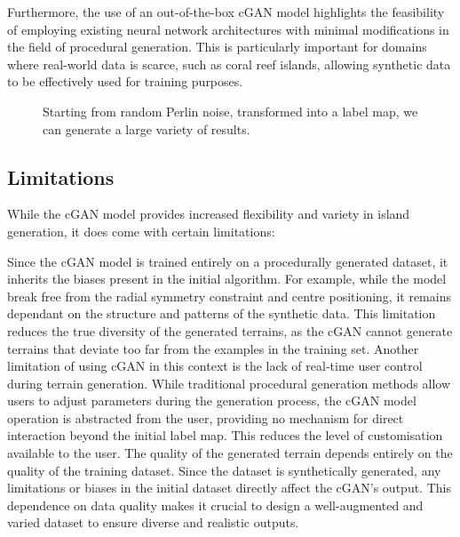 Furthermore, the use of an out-of-the-box cGAN model highlights the feasibility of employing existing neural network architectures with minimal modifications in the field of procedural generation. This is particularly important for domains where real-world data is scarce, such as coral reef islands, allowing synthetic data to be effectively used for training purposes.

\begin{figure}
    \caption{Starting from random Perlin noise, transformed into a label map, we can generate a large variety of results.}
    \label{fig:coral-island-perlin-examples}
\end{figure}

\subsection{Limitations}
\label{sec:coral-island-limitations}

While the cGAN model provides increased flexibility and variety in island generation, it does come with certain limitations:

\begin{Itemize}
     Since the cGAN model is trained entirely on a procedurally generated dataset, it inherits the biases present in the initial algorithm. For example, while the model break free from the radial symmetry constraint and centre positioning, it remains dependant on the structure and patterns of the synthetic data. This limitation reduces the true diversity of the generated terrains, as the cGAN cannot generate terrains that deviate too far from the examples in the training set.
     Another limitation of using cGAN in this context is the lack of real-time user control during terrain generation. While traditional procedural generation methods allow users to adjust parameters during the generation process, the cGAN model operation is abstracted from the user, providing no mechanism for direct interaction beyond the initial label map. This reduces the level of customisation available to the user.
     The quality of the generated terrain depends entirely on the quality of the training dataset. Since the dataset is synthetically generated, any limitations or biases in the initial dataset directly affect the cGAN's output. This dependence on data quality makes it crucial to design a well-augmented and varied dataset to ensure diverse and realistic outputs.
\end{Itemize}

